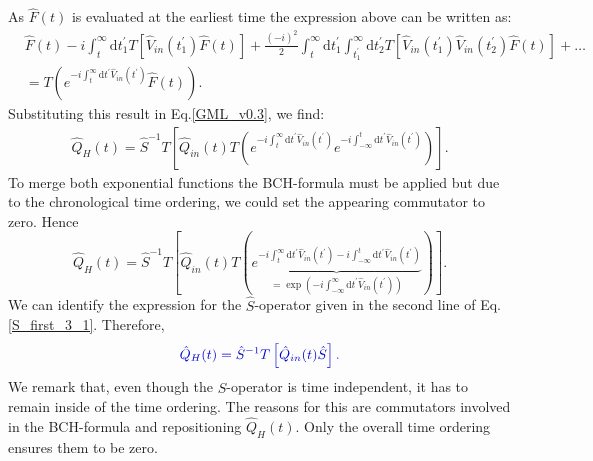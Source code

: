 \documentclass[12pt, titlepage]{article}
\begin{document}
As $ \hat{F}(t) $ is evaluated at the earliest time the expression above can be written as: 
\begin{equation}\label{Move_in_T_from_right}
\begin{split}
&
\hat{F}(t)\!
-\!
i\!
\int_{t}^{\infty}\! \!\mathrm{d}t^{\prime}_{1}
 T
 \left[ 
 \hat{V}_{in}(t^{\prime}_{1})
 \hat{F}(t)
 \right] \!
+\!
\frac{(-i)^{2}}{2}\!\!
\int_{t}^{\infty}\!  \mathrm{d}t^{\prime}_{1}
\int_{t^{\prime}_{1}}^{\infty}\!\!\mathrm{d}t^{\prime}_{2}
 T
 \left[ 
 \hat{V}_{in}(t^{\prime}_{1})\hat{V}_{in}(t^{\prime}_{2})
\hat{F}(t) 
 \right] 
+\ldots
\\
&=
T\left( 
 e^{-i\int_{t}^{\infty}\mathrm{d}t^{\prime} \hat{V}_{in}(t^{\prime})}
\hat{F}(t)
\right)
.
\end{split}
\end{equation} 
Substituting this result in Eq.\enskip\eqref{GML_v0.3}, we find:
\begin{equation}
\begin{split}
\hat{Q}_{H}(t)
=
\hat{S}^{-1} 
T
\left[
\hat{Q}_{in}(t)
T
\left( 
 e^{-i\int_{t}^{\infty}\mathrm{d}t^{\prime} \hat{V}_{in}(t^{\prime})}
 e^{-i\int_{-\infty}^{t}\mathrm{d}t^{\prime} \hat{V}_{in}(t^{\prime})}
\right) 
\right] 
.
\end{split}
\end{equation}
To merge both exponential functions the BCH-formula must be applied but due to the chronological time ordering, we could set the appearing commutator to zero. Hence
\begin{equation}\label{3rd_expression_for_Omega_H}
\hat{Q}_{H}(t)
=
\hat{S}^{-1} 
T
\left[
\hat{Q}_{in}(t)
T
\left( 
\underbrace{
 e^{-i\int_{t}^{\infty}\mathrm{d}t^{\prime} \hat{V}_{in}(t^{\prime})-i\int_{-\infty}^{t}\mathrm{d}t^{\prime} \hat{V}_{in}(t^{\prime})}
 }_{
 =\exp(-i\int_{-\infty}^{\infty}\mathrm{d}t^{\prime} \hat{V}_{in}(t^{\prime}))
 }
\right) 
\right]
.
\end{equation}
We can identify the expression for the $ \hat{S} $-operator given in the second line of Eq.\enskip\eqref{S_first_3_1}. Therefore,
 \begin{equation}\label{Gell_Mann-Low_for_one_Q}
\begin{split}
 \textcolor[RGB]{0,0,204}{
\hat{Q}_{H}(t)
=
\hat{S}^{-1} 
T
\left[ 
\hat{Q}_{in}(t)
\hat{S}
\right]
.
}
\end{split}
\end{equation}
We remark that, even though the $ \hat{S} $-operator is time independent, it has to remain inside of the time ordering. The reasons for this are commutators involved in the BCH-formula and repositioning $ \hat{Q}_{H}(t) $. Only the overall time ordering ensures them to be zero.
\end{document}
